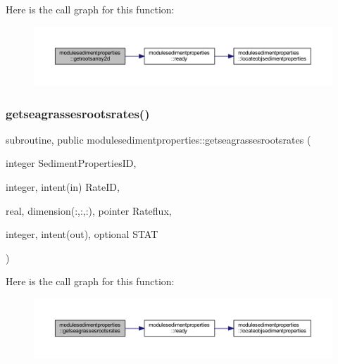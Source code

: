 Here is the call graph for this function\+:\nopagebreak
\begin{figure}[H]
\begin{center}
\leavevmode
\includegraphics[width=350pt]{namespacemodulesedimentproperties_a36fdb0ce96392baedfac23a2a327bf82_cgraph}
\end{center}
\end{figure}
\mbox{\label{namespacemodulesedimentproperties_a42d2292c7a554b05916ee8fcf65066b6}} 
\subsubsection{\texorpdfstring{getseagrassesrootsrates()}{getseagrassesrootsrates()}}
{\footnotesize\ttfamily subroutine, public modulesedimentproperties\+::getseagrassesrootsrates (\begin{DoxyParamCaption}\item[{integer}]{Sediment\+Properties\+ID,  }\item[{integer, intent(in)}]{Rate\+ID,  }\item[{real, dimension(\+:,\+:,\+:), pointer}]{Rateflux,  }\item[{integer, intent(out), optional}]{S\+T\+AT }\end{DoxyParamCaption})}

Here is the call graph for this function\+:\nopagebreak
\begin{figure}[H]
\begin{center}
\leavevmode
\includegraphics[width=350pt]{namespacemodulesedimentproperties_a42d2292c7a554b05916ee8fcf65066b6_cgraph}
\end{center}
\end{figure}
\mbox{\label{namespacemodulesedimentproperties_adaa8d0935c5e2ecaae01dd156ea881ca}} 
